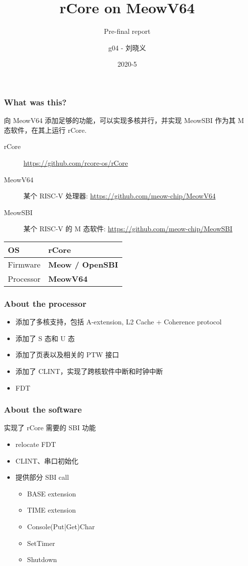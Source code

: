 \documentclass[UTF-8]{ctexbeamer}
\title{rCore on MeowV64}
\subtitle{Pre-final report}
\author{g04 - 刘晓义}
\date{2020-5}
\begin{document}
\begin{frame}
  \titlepage
\end{frame}

\begin{frame}
  \frametitle{What was this?}

  向 MeowV64 添加足够的功能，可以实现多核并行，并实现 MeowSBI 作为其 M 态软件，在其上运行 rCore.

  \begin{description}
    \item[rCore] \url{https://github.com/rcore-os/rCore}
    \item[MeowV64] 某个 RISC-V 处理器: \url{https://github.com/meow-chip/MeowV64}
    \item[MeowSBI] 某个 RISC-V 的 M 态软件: \url{https://github.com/meow-chip/MeowSBI}
  \end{description}

  \pause

  \begin{center}
    \begin{tabular}{|ll|} \hline
      OS & \textbf{rCore}\\
      \hline
      Firmware & \textbf{Meow / OpenSBI} \\
      \hline
      Processor & \textbf{MeowV64}\\
      \hline
    \end{tabular}
  \end{center}
\end{frame}
\begin{frame}
  \frametitle{About the processor}

  \begin{itemize}
    \item 添加了多核支持，包括 A-extension, L2 Cache + Coherence protocol
    \item 添加了 S 态和 U 态
    \item 添加了页表以及相关的 PTW 接口
    \item 添加了 CLINT，实现了跨核软件中断和时钟中断
    \item FDT
  \end{itemize}
\end{frame}

\begin{frame}
  \frametitle{About the software}

  实现了 rCore 需要的 SBI 功能

  \begin{itemize}
    \item relocate FDT
    \item CLINT、串口初始化
    \item 提供部分 SBI call
    \begin{itemize}
      \item BASE extension
      \item TIME extension
      \item Console(Put|Get)Char
      \item SetTimer
      \item Shutdown
    \end{itemize}
  \end{itemize}
\end{frame}
\end{document}
